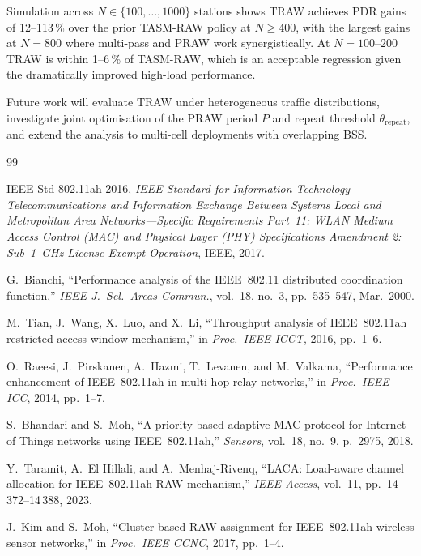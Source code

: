 \documentclass[conference]{IEEEtran}
\begin{document}
Simulation across $N\!\in\!\{100,\ldots,1000\}$ stations shows TRAW
achieves PDR gains of 12--113\,\% over the prior TASM-RAW policy at
$N\!\geq\!400$, with the largest gains at $N\!=\!800$ where multi-pass
and PRAW work synergistically.
At $N\!=\!100$--$200$ TRAW is within 1--6\,\% of TASM-RAW, which is
an acceptable regression given the dramatically improved high-load
performance.

Future work will evaluate TRAW under heterogeneous traffic
distributions, investigate joint optimisation of the PRAW period $P$
and repeat threshold $\theta_\mathrm{repeat}$, and extend the analysis
to multi-cell deployments with overlapping BSS.


\begin{thebibliography}{99}

IEEE Std 802.11ah-2016, \emph{IEEE Standard for Information
Technology---Telecommunications and Information Exchange Between
Systems Local and Metropolitan Area Networks---Specific Requirements
Part~11: WLAN Medium Access Control (MAC) and Physical Layer (PHY)
Specifications Amendment 2: Sub~1~GHz License-Exempt Operation},
IEEE, 2017.

G.~Bianchi, ``Performance analysis of the IEEE~802.11 distributed
coordination function,'' \emph{IEEE J.\ Sel.\ Areas Commun.},
vol.~18, no.~3, pp.~535--547, Mar.~2000.

M.~Tian, J.~Wang, X.~Luo, and X.~Li, ``Throughput analysis of
IEEE~802.11ah restricted access window mechanism,'' in
\emph{Proc.\ IEEE ICCT}, 2016, pp.~1--6.

O.~Raeesi, J.~Pirskanen, A.~Hazmi, T.~Levanen, and M.~Valkama,
``Performance enhancement of IEEE~802.11ah in multi-hop relay
networks,'' in \emph{Proc.\ IEEE ICC}, 2014, pp.~1--7.

S.~Bhandari and S.~Moh, ``A priority-based adaptive MAC protocol for
Internet of Things networks using IEEE~802.11ah,'' \emph{Sensors},
vol.~18, no.~9, p.~2975, 2018.

Y.~Taramit, A.~El Hillali, and A.~Menhaj-Rivenq, ``LACA: Load-aware
channel allocation for IEEE~802.11ah RAW mechanism,'' \emph{IEEE
Access}, vol.~11, pp.~14\,372--14\,388, 2023.

J.~Kim and S.~Moh, ``Cluster-based RAW assignment for IEEE~802.11ah
wireless sensor networks,'' in \emph{Proc.\ IEEE CCNC}, 2017,
pp.~1--4.


\end{thebibliography}
\end{document}
